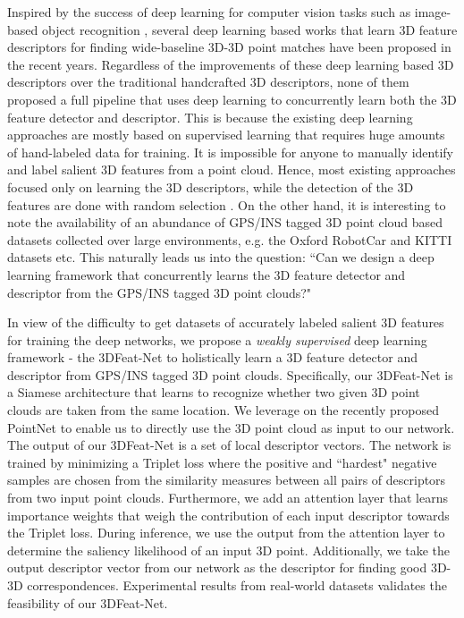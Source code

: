 \documentclass[runningheads]{llncs}
\begin{document}
Inspired by the success of deep learning for computer vision tasks such as image-based object recognition \cite{SIFTObjectRecognition}, several deep learning based works that learn 3D feature descriptors for finding wide-baseline 3D-3D point matches have been proposed in the recent years. Regardless of the improvements of these deep learning based 3D descriptors over the traditional handcrafted 3D descriptors, none of them proposed a full pipeline that uses deep learning to concurrently learn both the 3D feature detector and descriptor. This is because the existing deep learning approaches are mostly based on supervised learning that requires huge amounts of hand-labeled data for training. It is impossible for anyone to manually identify and label salient 3D features from a point cloud. Hence, most existing approaches focused only on learning the 3D descriptors, while the detection of the 3D features are done with random selection \cite{zeng20163dmatch,Elbaz2017CVPR}. On the other hand, it is interesting to note the availability of an abundance of GPS/INS tagged 3D point cloud based datasets collected over large environments, e.g. the Oxford RobotCar \cite{RobotCarDatasetIJRR} and KITTI \cite{kitti} datasets etc. This naturally leads us into the question: ``Can we design a deep learning framework that concurrently learns the 3D feature detector and descriptor from the GPS/INS tagged 3D point clouds?"

In view of the difficulty to get datasets of accurately labeled salient 3D features for training the deep networks, we propose a \textit{weakly supervised} deep learning framework - the 3DFeat-Net to holistically learn a 3D feature detector and descriptor from GPS/INS tagged 3D point clouds. Specifically, our 3DFeat-Net is a Siamese architecture \cite{bromley1994siamese} that learns to recognize whether two given 3D point clouds are taken from the same location. 
We leverage on the recently proposed PointNet \cite{pointnet,pointnetpp} to enable us to directly use the 3D point cloud as input to our network. The output of our 3DFeat-Net is a set of local descriptor vectors. The network is trained by minimizing a Triplet loss \cite{schroff2015facenet} where the positive and ``hardest" negative samples are chosen from the similarity measures between all pairs of descriptors \cite{karpathy2015alignment} from two input point clouds. 
Furthermore, we add an attention layer \cite{delf} that learns importance weights that weigh the contribution of each input descriptor towards the Triplet loss. During inference, we use the output from the attention layer to determine the saliency likelihood of an input 3D point. Additionally, we take the output descriptor vector from our network as the descriptor for finding good 3D-3D correspondences. Experimental results from real-world datasets \cite{RobotCarDatasetIJRR,kitti,ethdata} validates the feasibility of our 3DFeat-Net. 
\end{document}
